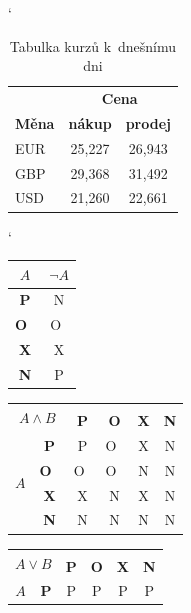 \documentclass[a4paper, 11pt]{article}
\begin{document}
\bigskip

\begin{table}[h]
\centering
\catcode`
	\begin{tabular}{|l|c|c|}
	\hline
	& \multicolumn{2}{c|}{\textbf{Cena}} \\ \cline{2-3}
	\textbf{Měna} & \textbf{nákup} & \textbf{prodej} \\ \hline
	EUR	& 25,227 & 26,943 \\
	GBP	& 29,368 & 31,492 \\
	USD	& 21,260 & 22,661 \\ \hline
	\end{tabular}
\caption{Tabulka kurzů k~dnešnímu dni}
\label{table:1}
\end{table}

\bigskip

\begin{table}[h] 
\centering 
\catcode`
\begin{tabular}[p]{|>{\bfseries}c|c|}
	\hline
	$A$	& ${\neg}A$	\\ \hline
	P & N \\ \hline
	O~& O~\\ \hline
	X & X \\ \hline
	N & P \\ \hline
		\end{tabular}
\begin{tabular}{|c|>{\bfseries}c|c|c|c|c|}
    \hline 
    \multicolumn{2}{|c|}{\multirow{2}{*}{$A \wedge B$}}&\multicolumn{4}{|c|}{$B$}\\\cline{3-6}
    \multicolumn{2}{|c|}{} & \textbf{P} & \textbf{O} & \textbf{X} & \textbf{N} \\ 
    \hline 
    \multirow{4}{*}{$A$}
    & P & P & O~& X & N \\ \cline{2-6} 
    & O~& O~& O~& N & N \\ \cline{2-6}
    & X & X & N & X & N \\ \cline{2-6}
    & N & N & N & N & N \\ \cline{2-6}
    \hline 
\end{tabular}
\begin{tabular}{|c|>{\bfseries}c|c|c|c|c|}
    \hline 
    \multicolumn{2}{|c|}{\multirow{2}{*}{$A \vee B$}}&\multicolumn{4}{|c|}{$B$}\\\cline{3-6}
    \multicolumn{2}{|c|}{} & \textbf{P} & \textbf{O} & \textbf{X} & \textbf{N} \\ 
    \hline 
    \multirow{4}{*}{$A$}
    & P & P & P & P & P \\ \cline{2-6} 

\end{tabular}
\end{table}
\end{document}
